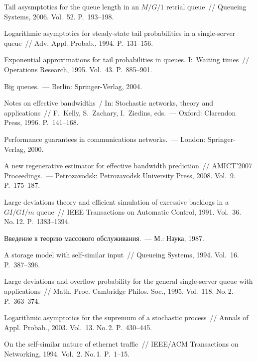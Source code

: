 \begin{multicols}{2}
{{\begin{thebibliography}{99}
Tail asysmptotics for the queue length in an $M/G/1$ retrial queue~//
 Queueing Systems, 2006. Vol.~52. P.~193--198.

Logarithmic asymptotics for steady-state tail probabilities in a single-server queue~// Adv.
Appl. Probab., 1994. P.~131--156.

Exponential approximations for tail probabilities in queues.
I:~Waiting times~// Operations Research, 1995. Vol.~43. P.~885--901.

Big queues.~--- Berlin: Springer-Verlag, 2004.

Notes on effective bandwidths~/ In: Stochastic
networks, theory and applications~// F.~Kelly, S.~Zachary, I.~Ziedins,
eds.~--- Oxford: Clarendon Press, 1996. P.~141--168.

Performance guarantees in communications networks.~--- London: Springer-Verlag, 2000.

A new regenerative estimator for effective bandwidth prediction~//
AMICT'2007 Proceedings.~--- Pet\-ro\-za\-vodsk: Pet\-ro\-za\-vodsk University
Press, 2008. Vol.~9. P.~175--187.

Large deviations theory and efficient simulation of excessive backlogs
 in a $GI/GI/m$ queue~//
IEEE Transactions on Automatic Control, 1991. Vol.~36. No.\,12. P.~1383--1394.

Введение в теорию массового обслуживания.~--- М.: Наука, 1987.

A storage model with self-similar input~//
 Queueing Systems, 1994. Vol.~16. P.~387--396.

 Large deviations and overflow probability for the general
 single-server queue with applications~//
 Math. Proc. Cambridge Philos. Soc., 1995. Vol.~118. No.\,2. P.~363--374.

Logarithmic asymptotics for the supremum of a stochastic process~// Annals of
Appl. Probab., 2003. Vol.~13. No.\,2. P.~430--445.

On the self-similar nature of ethernet traffic~//
IEEE/ACM Transactions on Networking, 1994. Vol.~2. No.\,1. P.~1--15.


\end{thebibliography}}}
\end{multicols}
